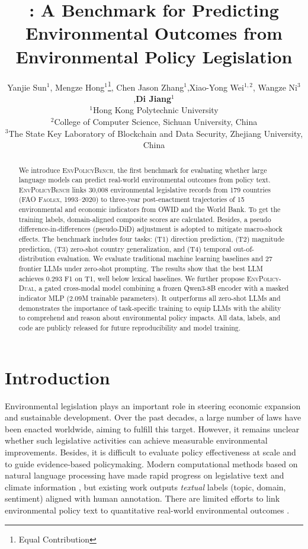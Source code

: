 \documentclass[11pt]{article}
\title{\bench: A Benchmark for Predicting Environmental Outcomes
from Environmental Policy Legislation}
\author{Yanjie Sun$^{1}$, Mengze Hong$^{1}$\thanks{Equal Contribution}, Chen Jason Zhang$^{1}$,Xiao-Yong Wei$^{1,2}$, Wangze Ni$^{3}$,\textbf{Di Jiang}$^{1}$\\ 
$^{1}$Hong Kong Polytechnic University \\ $^{2}$College of Computer Science, Sichuan University, China\\
$^{3}$The State Key Laboratory of Blockchain and Data Security, Zhejiang University, China
}
\newcommand{\ours}{\textsc{EnvPolicy-Dual}}
\newcommand{\bench}{\textsc{EnvPolicyBench}}
\begin{document}
\maketitle

\begin{abstract}
We introduce \bench, the first benchmark for evaluating whether large language models can predict real-world environmental outcomes from policy text. \bench{} links 30{,}008 environmental legislative records from 179 countries (FAO \textsc{Faolex}, 1993--2020) to three-year post-enactment trajectories of 15 environmental and economic indicators from OWID and the World Bank. To get the training labels, domain-aligned composite scores are calculated. Besides, a pseudo difference-in-differences (pseudo-DiD) adjustment is adopted to mitigate macro-shock effects. The benchmark includes four tasks: (T1) direction prediction, (T2) magnitude prediction, (T3) zero-shot country generalization, and (T4) temporal out-of-distribution evaluation. We evaluate traditional machine learning baselines and 27 frontier LLMs under zero-shot prompting. The results show that the best LLM achieves 0.293 F1 on T1, well below lexical baselines. We further propose \ours, a gated cross-modal model combining a frozen Qwen3-8B encoder with a masked indicator MLP (2.09M trainable parameters). It outperforms all zero-shot LLMs and demonstrates the importance of task-specific training to equip LLMs with the ability to comprehend and reason about environmental policy impacts. All data, labels, and code are publicly released for future  reproducibility and model training.
\end{abstract}

\section{Introduction}
\label{sec:intro}

Environmental legislation plays an important role in steering economic expansion and sustainable development. Over the past decades, a large number of  laws have been enacted worldwide, aiming to fulfill this target. However, it remains unclear whether such legislative activities can achieve measurable environmental improvements. Besides, it is difficult to evaluate policy effectiveness at scale and to guide evidence-based policymaking. Modern computational methods based on natural language processing have made rapid progress on legislative text \citep{chalkidis2019neural,chalkidis-etal-2022-lexglue} and climate information \citep{webersinke2022climatebert,spokoyny2023towards}, but existing work outputs \emph{textual} labels (topic, domain, sentiment) aligned with human annotation. There are limited efforts to link environmental policy text to quantitative real-world environmental outcomes \citep{dutta2025quantifying}.
\end{document}
